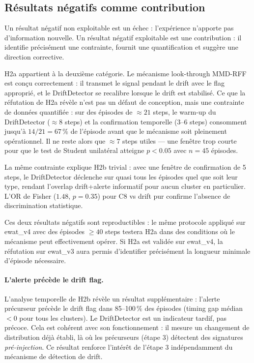 \subsection{Résultats négatifs comme contribution}
\label{sec:negative_results}

Un résultat négatif non exploitable est un échec : l'expérience n'apporte pas
d'information nouvelle. Un résultat négatif exploitable est une contribution :
il identifie précisément une contrainte, fournit une quantification et suggère
une direction corrective.

H2a appartient à la deuxième catégorie. Le mécanisme look-through MMD-RFF est
conçu correctement : il transmet le signal pendant le drift avec le flag approprié,
et le DriftDetector se recalibre lorsque le drift est stabilisé. Ce que la réfutation
de H2a révèle n'est pas un défaut de conception, mais une contrainte de données
quantifiée : sur des épisodes de $\approx 21$ steps, le warm-up du DriftDetector
($\approx 8$ steps) et la confirmation temporelle ($3$--$6$ steps) consomment jusqu'à
$14/21 = 67$\,\% de l'épisode avant que le mécanisme soit pleinement opérationnel.
Il ne reste alors que $\approx 7$ steps utiles --- une fenêtre trop courte pour que
le test de Student unilatéral atteigne $p < 0.05$ avec $n = 45$ épisodes.

La même contrainte explique H2b trivial : avec une fenêtre de confirmation de 5 steps,
le DriftDetector déclenche sur quasi tous les épisodes quel que soit leur type,
rendant l'overlap drift+alerte informatif pour aucun cluster en particulier.
L'OR de Fisher ($1.48$, $p = 0.35$) pour C8 vs drift pur confirme l'absence de
discrimination statistique.

Ces deux résultats négatifs sont reproductibles : le même protocole appliqué sur
ewat\_v4 avec des épisodes $\geq 40$ steps testera H2a dans des conditions où le
mécanisme peut effectivement opérer. Si H2a est validée sur ewat\_v4, la réfutation
sur ewat\_v3 aura permis d'identifier précisément la longueur minimale d'épisode
nécessaire.

\paragraph{L'alerte précède le drift flag.}
L'analyse temporelle de H2b révèle un résultat supplémentaire : l'alerte précurseur
précède le drift flag dans 85--100\,\% des épisodes (timing gap médian $< 0$
pour tous les clusters). Le DriftDetector est un indicateur tardif, pas précoce.
Cela est cohérent avec son fonctionnement : il mesure un changement de distribution
déjà établi, là où les précurseurs (étape 3) détectent des signatures
\emph{pré-injection}. Ce résultat renforce l'intérêt de l'étape 3 indépendamment
du mécanisme de détection de drift.

